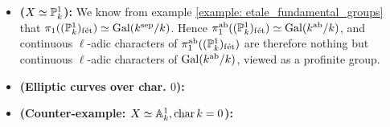         \begin{example}
            \noindent
            \begin{itemize}
                \item \textbf{($X \cong \P^1_k$):} We know from example \ref{example: etale_fundamental_groups} that $\pi_1((\P^1_k)_{\fet}) \cong \Gal(k^{\sep}/k)$. Hence $\pi_1^{\ab}((\P^1_k)_{\fet}) \cong \Gal(k^{\ab}/k)$, and continuous $\ell$-adic characters of $\pi_1^{\ab}((\P^1_k)_{\fet})$ are therefore nothing but continuous $\ell$-adic characters of $\Gal(k^{\ab}/k)$, viewed as a profinite group.
                \item \textbf{(Elliptic curves over char. $0$):}
                \item \textbf{(Counter-example: $X \cong \A^1_k, \chara k = 0$):}
            \end{itemize}
        \end{example}